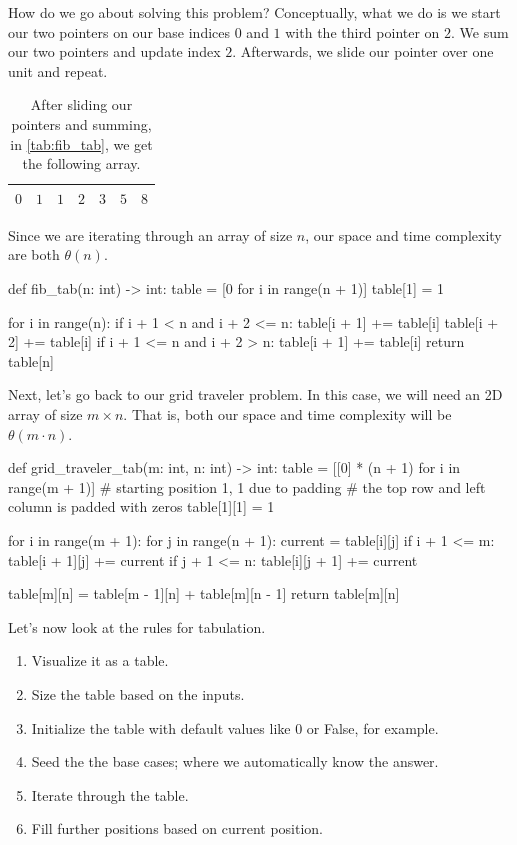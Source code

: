\documentclass[12pt,dvipsnames,svgnames,x11names]{article}
\begin{document}
How do we go about solving this problem? Conceptually, what we do is we start our two pointers on our
base indices \(0\) and \(1\) with the third pointer on \(2\). We sum our two pointers and update index \(2\).
Afterwards, we slide our pointer over one unit and repeat.
\begin{table}[h]
	\centering
	\begin{tabular}{| *{7}{|c|} |}
  		\hline			
  		\(0\) & \(1\) & \(1\) & \(2\) & \(3\) & \(5\) & \(8\) \\
  		\hline  
	\end{tabular}
	\caption{After sliding our pointers and summing, in \cref{tab:fib_tab}, we get the following array.}
	\label{tab:fib_tab_complete}
\end{table}
Since we are iterating through an array of size \(n\), our space and time complexity are both 
\(\theta(n)\).
\begin{python}
def fib_tab(n: int) -> int:
  table = [0 for i in range(n + 1)]
  table[1] = 1
    
  for i in range(n):
    if i + 1 < n and i + 2 <= n:
      table[i + 1] += table[i]
      table[i + 2] += table[i]
    if i + 1 <= n and i + 2 > n:
      table[i + 1] += table[i]  
  return table[n]
\end{python}
\par\medskip
Next, let's go back to our grid traveler problem. In this case, we will need an 2D array of size 
\(m\times n\). That is, both our space and time complexity will be \(\theta(m\cdot n)\).
\begin{python}
def grid_traveler_tab(m: int, n: int) -> int:
  table = [[0] * (n + 1) for i in range(m + 1)]
  # starting position 1, 1 due to padding
  # the top row and left column is padded with zeros
  table[1][1] = 1
    
  for i in range(m + 1):
    for j in range(n + 1):
      current = table[i][j]
      if i + 1 <= m:
        table[i + 1][j] += current
      if j + 1 <= n:
        table[i][j + 1] += current
                
  table[m][n] = table[m - 1][n] + table[m][n - 1]    
  return table[m][n]
\end{python}
\par\medskip
Let's now look at the rules for tabulation.
\begin{enumerate}
	\item Visualize it as a table.
	\item Size the table based on the inputs.
	\item Initialize the table with default values like \(0\) or False, for example.
	\item Seed the the base cases; where we automatically know the answer.
	\item Iterate through the table.
	\item Fill further positions based on current position.
\end{enumerate}
\end{document}
